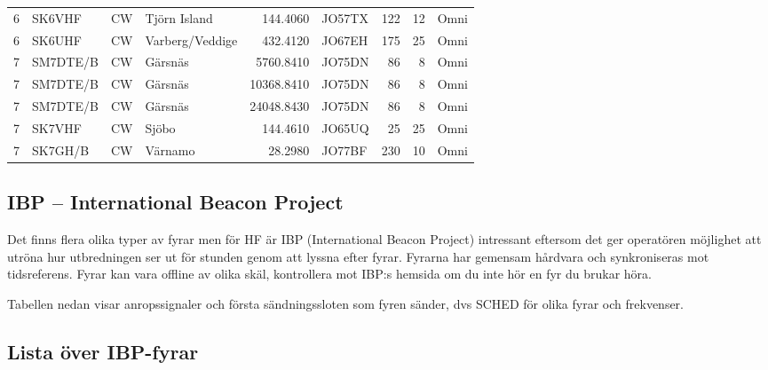 \begin{landscape}
\begin{longtable}{rlllrlrrl}
	                 6 & SK6VHF     & CW      & Tjörn Island           &     144.4060 & JO57TX      &      122 &       12 & Omni         \\
	                 6 & SK6UHF     & CW      & Varberg/Veddige        &     432.4120 & JO67EH      &      175 &       25 & Omni         \\
	                 7 & SM7DTE/B   & CW      & Gärsnäs                &    5760.8410 & JO75DN      &       86 &        8 & Omni         \\
	                 7 & SM7DTE/B   & CW      & Gärsnäs                &   10368.8410 & JO75DN      &       86 &        8 & Omni         \\
	                 7 & SM7DTE/B   & CW      & Gärsnäs                &   24048.8430 & JO75DN      &       86 &        8 & Omni         \\
	                 7 & SK7VHF     & CW      & Sjöbo                  &     144.4610 & JO65UQ      &       25 &       25 & Omni         \\
	                 7 & SK7GH/B    & CW      & Värnamo                &      28.2980 & JO77BF      &      230 &       10 & Omni
\end{longtable}
\end{landscape}

\clearpage

\subsection{IBP -- International Beacon Project}

Det finns flera olika typer av fyrar men för HF är IBP (International Beacon
Project) intressant eftersom det ger operatören möjlighet att utröna hur
utbredningen ser ut för stunden genom att lyssna efter fyrar. Fyrarna har
gemensam hårdvara och synkroniseras mot tidsreferens. Fyrar kan vara offline
av olika skäl, kontrollera mot IBP:s hemsida om du inte hör en fyr du brukar
höra.

Tabellen nedan visar anropssignaler och första sändningssloten som fyren
sänder, dvs SCHED för olika fyrar och frekvenser.

\subsection{Lista över IBP-fyrar}

